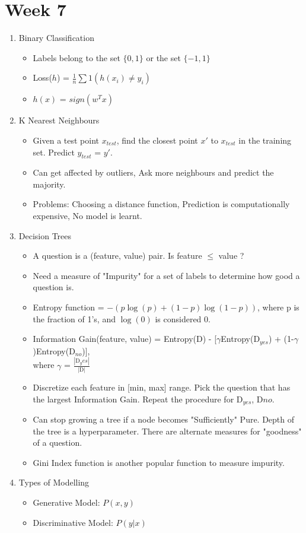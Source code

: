 \documentclass[a4paper]{article}
\begin{document}
\section{Week 7}
\begin{enumerate}
    \item Binary Classification
    \begin{itemize}
        \item Labels belong to the set $\{0,1\}$ or the set $\{-1,1\}$
        \item Loss($h$) = $\frac{1}{n}\sum 1(h(x_i) \neq y_i)$
        \item $h(x)$ = $sign(w^Tx)$
    \end{itemize}
    \item K Nearest Neighbours
    \begin{itemize}
        \item Given a test point $x_{test}$, find the closest point $x'$ to $x_{test}$ in the training set. Predict $y_{test}$ = $y'$.
        \item Can get affected by outliers, Ask more neighbours and predict the majority.
        \item Problems: Choosing a distance function, Prediction is computationally expensive, No model is learnt.
    \end{itemize}
    \item Decision Trees
    \begin{itemize}
        \item A question is a (feature, value) pair. Is feature $\leq$ value ?
        \item Need a measure of "Impurity" for a set of labels to determine how good a question is.
        \item Entropy function = $-(p\log(p) + (1-p)\log(1-p))$, where p is the fraction of 1's, and $\log(0)$ is considered 0.
        \item Information Gain(feature, value) = Entropy(D) - [$\gamma$Entropy(D$_{yes}$) + (1-$\gamma$)Entropy(D$_{no}$)],\\
        where $\gamma$ = $\frac{|\text{D}_yes|}{|\text{D}|}$
        \item Discretize each feature in [min, max] range. Pick the question that has the largest Information Gain. Repeat the procedure for D$_{yes}$, D${no}$.
        \item Can stop growing a tree if a node becomes "Sufficiently" Pure. Depth of the tree is a hyperparameter. There are alternate measures for "goodness" of a question.
        \item Gini Index function is another popular function to measure impurity.
    \end{itemize}
    \item Types of Modelling
    \begin{itemize}
        \item Generative Model: $P(x, y)$
        \item Discriminative Model: $P(y|x)$
    \end{itemize}
\end{enumerate}
\end{document}

